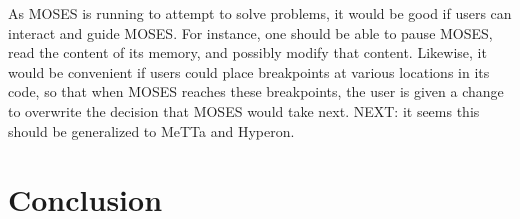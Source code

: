 \documentclass[]{report}
\begin{document}
As MOSES is running to attempt to solve problems, it would be good if
users can interact and guide MOSES.  For instance, one should be able
to pause MOSES, read the content of its memory, and possibly modify
that content.  Likewise, it would be convenient if users could place
breakpoints at various locations in its code, so that when MOSES
reaches these breakpoints, the user is given a change to overwrite the
decision that MOSES would take next.  NEXT: it seems this should be
generalized to MeTTa and Hyperon.

\chapter{Conclusion}

 
\end{document}
